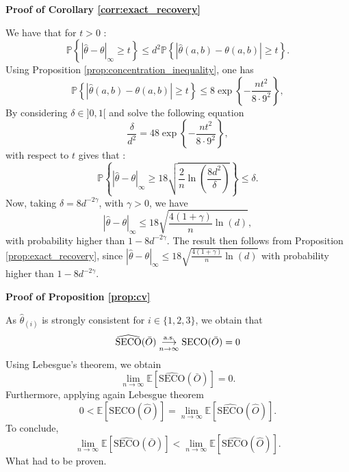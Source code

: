 \documentclass[11pt]{article}
\makeatletter
\newcommand{\SECO}{\mathrm{SECO}}
\theoremstyle{definition}
\renewenvironment{proof}[1][\proofname]{\par
\pushQED{\qed}%
\normalfont \topsep6\p@\@plus6\p@\relax
\trivlist
\item\relax
{\textbf{
#1\@addpunct{ }}}\hspace\labelsep\ignorespaces
}{%
\popQED\endtrivlist\@endpefalse
}
\makeatother
\begin{document}
	\begin{proof}[Proof of Corollary \ref{corr:exact_recovery}]
		We have that for $t>0$ :
		\begin{equation*}
			\mathbb{P}\left\{ |\hat{\theta} - \theta|_{\infty} \geq t \right\} \leq d^2 \mathbb{P}\left\{|\hat{\theta}(a,b) - \theta(a,b)| \geq t \right\}.
		\end{equation*}
		Using Proposition \ref{prop:concentration_inequality}, one has 
		\begin{equation*}
			\mathbb{P}\left\{|\hat{\theta}(a,b) - \theta(a,b)| \geq t \right\} \leq 8 \exp\left\{ - \frac{nt^2}{8 \cdot 9^2} \right\},
		\end{equation*}
		By considering $\delta \in ]0,1[$ and solve the following equation
		\begin{equation*}
			\frac{\delta}{d^2} = 4 8 \exp\left\{ - \frac{nt^2}{8 \cdot 9^2}\right\},
		\end{equation*}
		with respect to $t$ gives that :
		\begin{equation*}
			\mathbb{P}\left\{ |\hat{\theta} - \theta|_{\infty} \geq 18 \sqrt{\frac{2}{n} \ln\left( \frac{8 d^2}{\delta} \right)} \right\} \leq \delta.
		\end{equation*}
		Now, taking $\delta = 8d^{-2\gamma}$, with $\gamma > 0$, we have
		\begin{equation*}
			|\hat{\theta} - \theta|_{\infty} \leq 18 \sqrt{\frac{4(1+\gamma)}{n} \ln\left( d \right)},
		\end{equation*}
		with probability higher than $1 - 
		8d^{-2\gamma}$. The result then follows from Proposition \ref{prop:exact_recovery}, since $|\hat{\theta} - \theta|_{\infty} \leq 18 \sqrt{\frac{4(1+\gamma)}{n} \ln(d)}$ with probability higher than $1-8d^{-2\gamma}$.
	\end{proof}
	
	\begin{proof}[Proof of Proposition \ref{prop:cv}]
	
		As $\hat{\theta}_{(i)}$ is strongly consistent for $i \in \{1,2,3\}$, we obtain that
		\begin{equation*}
			\widehat{\SECO}(\bar{O}) \overunderset{\textrm{a.s.}}{n \rightarrow \infty}{\longrightarrow} \SECO(\bar{O}) = 0			
		\end{equation*}
		Using Lebesgue's theorem, we obtain
		\begin{equation*}
			\underset{n \rightarrow \infty}{\lim}\mathbb{E}\left[ \widehat{\SECO}(\bar{O}) \right] = 0.
		\end{equation*}	
		Furthermore, applying again Lebesgue theorem
		\begin{equation*}
			0 < \mathbb{E} \left[ \SECO(\hat{O}) \right] = \underset{n \rightarrow \infty}{\lim} \mathbb{E}\left[\widehat{\SECO}(\hat{O}) \right].
		\end{equation*}
		To conclude,
		\begin{equation*}
		\underset{n \rightarrow \infty}{\lim}\mathbb{E}\left[ \widehat{\SECO}(\bar{O}) \right] < \underset{n \rightarrow \infty}{\lim} \mathbb{E}\left[\widehat{\SECO}(\hat{O}) \right].
		\end{equation*}
		What had to be proven.
	\end{proof}
	
\end{document}
